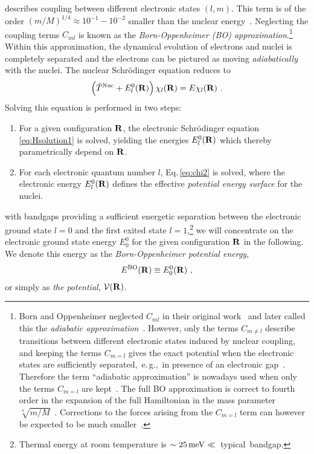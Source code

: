 describes coupling between different electronic states $(l, m)$. This term is of the order $(m/M)^{1/4} \approx 10^{-1} - 10^{-2}$ smaller than the nuclear energy~\cite{BornOppenheimer}. Neglecting the coupling terms $C_{ml}$ is known as the \emph{Born-Oppenheimer (BO) approximation}.\footnote[][0em]{Born and Oppenheimer neglected $C_{ml}$ in their original work~\cite{BornOppenheimer} and later called this the \emph{adiabatic approximation}~\cite{BornHuang}. However, only the terms $C_{m \neq l}$ describe transitions between different electronic states induced by nuclear coupling, and keeping the terms $C_{m=l}$ gives the exact potential when the electronic states are sufficiently separated,~e.\,g.,~in presence of an electronic gap~\cite{Born1951kopplung}. Therefore the term ``adiabatic approximation'' is nowadays used when only the terms $C_{m=l}$ are kept~\cite{Marx2009}. The full BO approximation is correct to fourth order in the expansion of the full Hamiltonian in the mass parameter $\sqrt[4]{m/M}$~\cite{BornHuang}. Corrections to the forces arising from the $C_{m=l}$ term can however be expected to be much smaller~\cite{Ziman1955}.
} Within this approximation, the dynamical evolution of electrons and nuclei is completely separated and the electrons can be pictured as moving \emph{adiabatically} with the nuclei. The nuclear Schr\"odinger equation reduces to
\begin{align}
    \left( \hat{T}^{\rm Nuc} + E^0_l({\bf R}) \right) \chi_l ({\bf R})
        = E \chi_l ({\bf R})~.
    \label{eq:chi2}
\end{align}
Solving this equation is performed in two steps:
\begin{enumerate}
    \item For a given configuration $\bf R$, the electronic Schr\"odinger equation \eqref{eq:Hsolution1} is solved, yielding the energies $E^0_l({\bf R})$ which thereby parametrically depend on $\bf R$.
    \item For each electronic quantum number $l$, Eq.\,\eqref{eq:chi2} is solved, where the electronic energy $E^0_l({\bf R})$ defines the effective \emph{potential energy surface} for the nuclei.
\end{enumerate}

 with bandgaps providing a sufficient energetic separation between the electronic ground state $l=0$ and the first exited state $l=1$,\footnote{Thermal energy at room temperature is \mbox{$\sim 25\,{\rm meV} \ll $~typical bandgap}.} we will concentrate on the electronic ground state energy $E^0_0$ for the given configuration ${\bf R}$ in the following. We denote this energy as the \emph{Born-Oppenheimer potential energy},
\begin{align}
	E^{\rm BO} ({\bf R}) \equiv E^0_0 ({\bf R})~,
	\label{eq:E^BO_0}
\end{align}
or simply as \emph{the potential}, $\mathcal V ({\bf R}) $.

